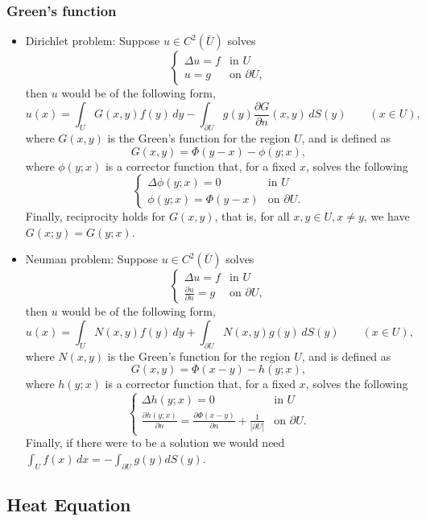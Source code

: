\documentclass[oneside,a4paper,11pt]{report}
\begin{document}
\subsubsection{Green's function}
\begin{itemize}
\item Dirichlet problem: Suppose $u \in C^2(\bar{U})$ solves
\[ \begin{cases}
\Delta u = f & \text{in } U \\
u = g & \text{on } \partial U,
\end{cases}\]
then $u$ would be of the following form,
\[ u(x) = \int_{U} G(x,y) f(y)\,dy - \int_{\partial U} g(y) \frac{\partial G}{\partial n}(x,y) \,dS(y) \qquad (x \in U),\]
where $G(x,y)$ is the Green's function for the region $U$, and is defined as
\[G(x,y) = \Phi(y-x) - \phi(y;x),\]
where $\phi(y;x)$ is a corrector function that, for a fixed $x$, solves the following
\[ \begin{cases}
\Delta \phi(y;x) = 0 & \text{in } U\\
\phi(y;x) = \Phi(y-x) & \text{on } \partial U.
\end{cases}\]
Finally, reciprocity holds for $G(x,y)$, that is, for all $x,y \in U, x\neq y$, we have $G(x;y) = G(y;x)$.

\item Neuman problem: Suppose $u \in C^2(\bar{U})$ solves
\[ \begin{cases}
\Delta u = f & \text{in } U \\
\frac{\partial u}{\partial n} = g & \text{on } \partial U,
\end{cases}\]
then $u$ would be of the following form,
\[ u(x) = \int_{U} N(x,y)f(y) \,dy  + \int_{\partial U} N(x,y)g(y) \,dS(y)\qquad (x \in U),\]
where $N(x,y)$ is the Green's function for the region $U$, and is defined as
\[G(x,y) = \Phi(x-y) - h(y;x),\]
where $h(y;x)$ is a corrector function that, for a fixed $x$, solves the following
\[ \begin{cases}
\Delta h(y;x) = 0 & \text{in } U\\
\frac{\partial h(y;x)}{\partial n} = \frac{\partial \Phi(x-y)}{\partial n} + \frac{1}{|\partial U|} & \text{on } \partial U.
\end{cases}\]
Finally, if there were to be a solution we would need $\int_U f(x)\,dx = -\int_{\partial U} g(y) dS(y)$.

\end{itemize}
\subsection{Heat Equation}
\end{document}
